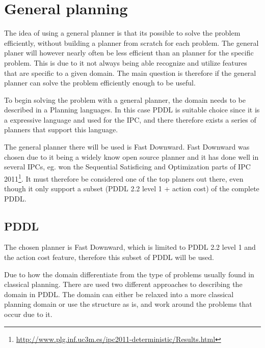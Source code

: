 \chapter{General planning}
	The idea of using a general planner is that its possible to solve the problem efficiently, without building a planner from scratch for each problem. The general planer will however nearly often be less efficient than an planner for the specific problem. This is due to it not always being able recognize and utilize features that are specific to a given domain. The main question is therefore if the general planner can solve the problem efficiently enough to be useful.

	To begin solving the problem with a general planner, the domain needs to be described in a Planning languages. In this case PDDL is suitable choice since it is a expressive language and used for the IPC, and there therefore exists a series of planners that support this language.
 
	  
	
	The general planner there will be used is Fast Downward. Fast Downward was chosen due to it being a widely know open source planner and it has done well in several IPCs, eg. won the Sequential Satisficing and Optimization parts of IPC 2011\footnote{\url{http://www.plg.inf.uc3m.es/ipc2011-deterministic/Results.html}}. It must therefore be considered one of the top planers out there, even though it only support a subset (PDDL 2.2 level 1 + action cost) of the complete PDDL.
 
 \section{PDDL}

	The chosen planner is Fast Downward, which is limited to PDDL 2.2 level 1 and the action cost feature, therefore this subset of PDDL will be used.

	Due to how the domain differentiate from the type of problems usually found in classical planning. There are used two different approaches to describing the domain in PDDL. The domain can either be relaxed into a more classical planning domain or use the structure as is, and work around the problems that occur due to it.
	
